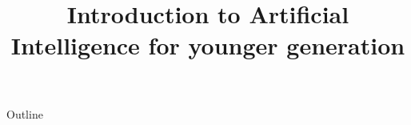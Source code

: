 \documentclass[xcolor=dvipsnames,compress,t,pdf,notes,9pt]{beamer}
\title[\insertframenumber /\inserttotalframenumber]{Introduction to Artificial Intelligence for younger generation}
\begin{document}
	\begin{frame}
	\titlepage
	\end{frame}
	
	\begin{frame}{Outline}
	    \tableofcontents
	\end{frame}

	
	
	
\end{document}
